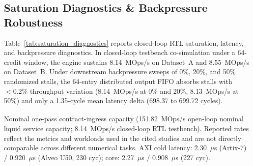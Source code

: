 \documentclass[sigconf,anonymous,review]{acmart}
\begin{document}
\subsection{Saturation Diagnostics \& Backpressure Robustness}
Table~\ref{tab:saturation_diagnostics} reports closed-loop RTL saturation, latency, and backpressure diagnostics. In closed-loop testbench co-simulation under a 64-credit window, the engine sustains 8.14~MOps/s on Dataset~A and 8.55~MOps/s on Dataset~B. Under downstream backpressure sweeps of 0\%, 20\%, and 50\% randomized stalls, the 64-entry distributed output FIFO absorbs stalls with $<0.2\%$ throughput variation (8.14~MOps/s at 0\% and 20\%, 8.13~MOps/s at 50\%) and only a 1.35-cycle mean latency delta (698.37 to 699.72 cycles).
\begin{table}[t]
\caption{Architectural Comparison with Prior FPGA Option Accelerators}
\label{tab:prior_art}
\centering
{}
\vskip 1pt\raggedright
\footnotesize{\textsuperscript{\dag}Nominal one-pass contract-ingress capacity (151.82~MOps/s open-loop nominal liquid service capacity; 8.14~MOps/s closed-loop RTL testbench). Reported rates reflect the metrics and workloads used in the cited studies and are not directly comparable across different numerical tasks. AXI cold latency: 2.30~$\mu$s (Artix-7) / 0.920~$\mu$s (Alveo U50, 230 cyc); core: 2.27~$\mu$s / 0.908~$\mu$s (227 cyc).}
\end{table}
\end{document}
